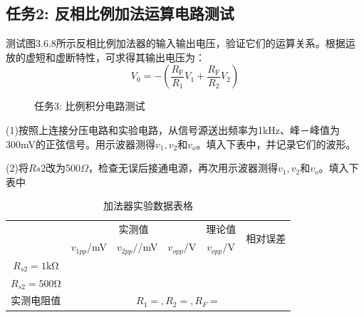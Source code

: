 \documentclass[a4paper,11pt,UTF8]{article}
\begin{document}
\subsection{任务2: 反相比例加法运算电路测试}
测试图3.6.8所示反相比例加法器的输入输出电压，验证它们的运算关系。根据运放的虚短和虚断特性，可求得其输出电压为：
$$
	V_0=-\left(\frac{R_{\mathrm{F}}}{R_1}V_1+\frac{R_{\mathrm{F}}}{R_2}V_2\right)
$$
\begin{figure}[H]
	\centering
	\caption*{任务3: 比例积分电路测试}
\end{figure}
(1)按照上连接分压电路和实验电路，从信号源送出频率为1kHz、峰－峰值为300mV的正弦信号。用示波器测得$v_1,v_2$和$v_o$。填入下表中，并记录它们的波形。

(2)将$Rs2$改为500$\Omega$，检查无误后接通电源，再次用示波器测得$v_1,v_2$和$v_o$。填入下表中
\begin{table}[h]
	\centering
	\caption{加法器实验数据表格}
	\label{table1}
	\begin{tabular}{|c|c|c|c|c|c|}
		\hline
		\multirow{2}{*}{}   & \multicolumn{3}{c|}{实测值} & 理论值 &
		\multirow{2}{*}{相对误差}\\
		\cline{2-5}
		\multirow{2}{*}{} & $v_{1pp}$/mV & $v_{2pp}/$/mV & $v_{opp}$/V & $v_{opp}$/V & \multirow{2}{*}{}\\
		\hline
		$R_{s2}=1\mathrm{k\Omega}$ &  &  &  & &  \\
		\hline
		$R_{s2}=500\mathrm{\Omega}$ &  &  &  &  &  \\
		\hline
		实测电阻值 & \multicolumn{5}{c|}{$R_1=,R_2=, R_F=$}\\
		\hline
	\end{tabular}
\end{table}
\end{document}
